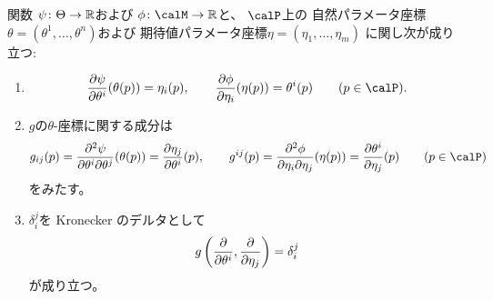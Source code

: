 \documentclass[report]{jlreq}
\begin{document}
\begin{theorem}[自然パラメータ座標と期待値パラメータ座標の関係]
    関数
    $\psi \colon \Theta \to \mathbb{R}$および
    $\phi \colon \calM \to \R$と、
    $\calP$上の
    自然パラメータ座標$\theta = (\theta^1, \dots, \theta^n)$および
    期待値パラメータ座標$\eta = (\eta_1, \dots, \eta_m)$
    に関し次が成り立つ:
    \begin{enumerate}
        \item
            \begin{equation}
                \deldel[\psi]{\theta^i}(\theta(p)) = \eta_i(p),
                    \qquad
                    \deldel[\phi]{\eta_i}(\eta(p)) = \theta^i(p)
                    \qquad
                    (p \in \calP).
            \end{equation}
        \item $g$の$\theta$-座標に関する成分は
            \begin{equation}
                g_{ij}(p)
                    =
                        \frac{
                            \del^2 \psi
                        }{
                            \del \theta^i
                            \del \theta^j
                        }
                        (\theta(p))
                    =
                        \deldel[\eta_j]{\theta^i}(p),
                        \qquad
                g^{ij}(p)
                    =
                        \frac{
                            \del^2 \phi
                        }{
                            \del \eta_i
                            \del \eta_j
                        }
                        (\eta(p))
                    =
                        \deldel[\theta^i]{\eta_j}(p)
                        \qquad
                        (p \in \calP)
            \end{equation}
            をみたす。
        \item $\delta_i^j$を Kronecker のデルタとして
            \begin{equation}
                g\myparen{
                    \deldel{\theta^i},
                    \deldel{\eta_j}
                }
                    =
                        \delta_i^j
            \end{equation}
            が成り立つ。
    \end{enumerate}
\end{theorem}
\end{document}
